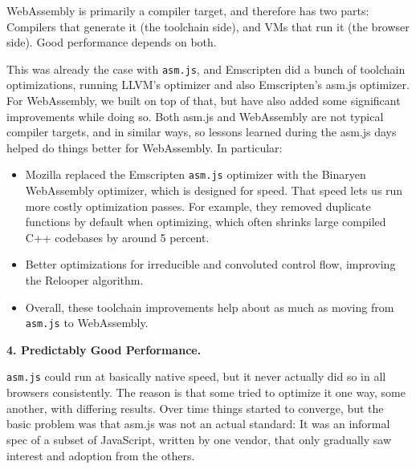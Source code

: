 WebAssembly is primarily a compiler target, and therefore has two parts: Compilers that generate it (the toolchain side), and VMs that run it (the browser side). Good performance depends on both.

This was already the case with \texttt{asm.js}, and Emscripten did a bunch of toolchain optimizations, running LLVM’s optimizer and also Emscripten’s asm.js optimizer. For WebAssembly, we built on top of that, but have also added some significant improvements while doing so. Both asm.js and WebAssembly are not typical compiler targets, and in similar ways, so lessons learned during the asm.js days helped do things better for WebAssembly. In particular:
\begin{itemize}
\item Mozilla replaced the Emscripten \texttt{asm.js} optimizer with the Binaryen WebAssembly optimizer, which is designed for speed. That speed lets us run more costly optimization passes. For example, they removed duplicate functions by default when optimizing, which often shrinks large compiled C++ codebases by around 5 percent.
\item Better optimizations for irreducible and convoluted control flow, improving the Relooper algorithm.
\item Overall, these toolchain improvements help about as much as moving from \texttt{asm.js} to WebAssembly.
\end{itemize}
  
\textbf{4. Predictably Good Performance.}

\texttt{asm.js} could run at basically native speed, but it never actually did so in all browsers consistently. The reason is that some tried to optimize it one way, some another, with differing results. Over time things started to converge, but the basic problem was that asm.js was not an actual standard: It was an informal spec of a subset of JavaScript, written by one vendor, that only gradually saw interest and adoption from the others.  
